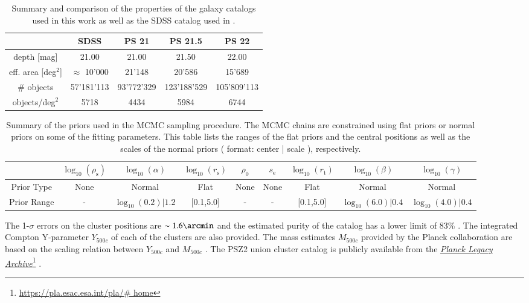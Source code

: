 \documentclass[iop, apjl, twocolappendix, numberedappendix]{emulateapj}
\newcommand\fnurl[2]{%
  \href{#2}{#1}\footnote{\url{#2}}%
}
\begin{document}
\begin{table}
    \centering
    \caption{Summary and comparison of the properties of the galaxy catalogs used in this work as well as the SDSS catalog used in \citet{more2016detection}.}
    \label{tab:galaxy_catalogs}
    \begin{tabular}{ccccc}
    \hline 
    & SDSS & PS 21 & PS 21.5 & PS 22 \\ 
    \hline 
    depth [mag] & 21.00 & 21.00 & 21.50 & 22.00\\ 
    \hline 
    eff. area [deg$^2$] & $\approx$ 10'000 & 21'148 & 20'586 & 15'689\\ 
    \hline 
    \# objects & 57'181'113 & 93'772'329 & 123'188'529 & 105'809'113 \\
    \hline
    objects/deg$^2$ & 5718 & 4434 & 5984 & 6744\\ 
    \hline
    \end{tabular} 
\end{table}
\begin{table}
    \centering
    \caption{Summary of the priors used in the MCMC sampling
procedure. The MCMC chains are constrained using flat priors or
normal priors on some of the fitting parameters. This table lists
the ranges of the flat priors and the central positions as well as
the scales of the normal priors ( format: center | scale ),
respectively.}
    \label{tab:priors}
    \begin{tabular}{ccccccccc}
    \hline 
    & $\log_{10}(\rho_{\mathrm{s}})$ & $\log_{10}(\alpha)$ & $\log_{10}(r_{\mathrm{s}})$ & $\rho_0$ & $s_{\mathrm{e}}$ & $\log_{10}(r_{\mathrm{t}})$ & $\log_{10}(\beta)$ & $\log_{10}(\gamma)$ \\ 
    \hline 
    Prior Type & None & Normal & Flat & None & None & Flat & Normal & Normal\\ 
    \hline 
    Prior Range & - & $\log_{10}(0.2)| 1.2$ & [0.1,5.0] & - & - & [0.1,5.0] & $\log_{10}(6.0) | 0.4$ & $\log_{10}(4.0) | 0.4$ \\
    \hline
    \end{tabular} 
\end{table}

The 1-$\sigma$ errors on the cluster positions are $\sim1.6\arcmin$
and the estimated purity of the catalog has a lower limit of 83\%
\citep{ade2016psclusters}. The integrated Compton Y-parameter
$Y_{500c}$ of each of the clusters are also provided. The mass
estimates $M_{500c}$ provided by the Planck collaboration are based on
the scaling relation between $Y_{500c}$ and $M_{500c}$
\citep{ade2014planck,adam2016planck,collaboration2016planck}. The PSZ2
union cluster catalog is publicly available from the
\fnurl{\textit{Planck Legacy Archive}}{https://pla.esac.esa.int/pla/\#
home}.
\end{document}
